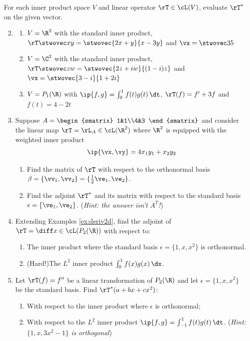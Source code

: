 \begin{exercises}
\exstart For each inner product space $V$ and linear operator $\rT\in\cL(V)$, evaluate $\rT^*$ on the given vector.
\begin{enumerate}\setcounter{enumi}{1}
  \item[]\begin{enumerate}
    \item $V=\R^2$ with the standard inner product, $\rT\stwovec xy=\stwovec{2x+y}{x-3y}$ and $\vx=\stwovec 35$
    \item $V=\C^2$ with the standard inner product, $\rT\stwovec zw=\stwovec{2z+iw}{(1-i)z}$ and $\vx=\stwovec{3-i}{1+2i}$
    \item $V=P_1(\R)$ with $\ip{f,g}=\int_0^1 f(t)g(t)\,\dt$, $\rT(f)=f'+3f$ and $f(t)=4-2t$
  \end{enumerate}
  
	\item Suppose $A=\begin{smatrix}
	1&1\\4&3
	\end{smatrix}$ and consider the linear map $\rT=\rL_A\in\cL(\R^2)$ where $\R^2$ is equipped with the weighted inner product
	\[\ip{\vx,\vy}=4x_1y_1+x_2y_2\]
	\begin{enumerate}
	  \item Find the matrix of $\rT$ with respect to the orthonormal basis $\beta=\{\vv_1,\vv_2\}=\{\frac 12\ve_1,\ve_2\}$.
	  \item	Find the adjoint $\rT^*$ and its matrix with respect to the standard basis $\epsilon=\{\ve_1,\ve_2\}$.\smallbreak
		(\emph{Hint: the answer isn't $A^T$!})
	\end{enumerate}
	
	\item Extending Examples \ref{ex:deriv2d}, find the adjoint of $\rT=\diff x\in\cL(P_2(\R))$ with respect to:
	\begin{enumerate}
	  \item The inner product where the standard basis $\epsilon=\{1,x,x^2\}$ is orthonormal.
	  \item (Hard!)\quad The $L^2$ inner product $\int_0^1f(x)g(x)\,\dx$.
	\end{enumerate}
  
  
  \item Let $\rT(f)=f''$ be a linear transformation of $P_2(\R)$ and let $\epsilon=\{1,x,x^2\}$ be the standard basis. Find $\rT^*(a+bx+cx^2)$:
  \begin{enumerate}
    \item With respect to the inner product where $\epsilon$ is orthonormal;
    \item With respect to the $L^2$ inner product $\ip{f,g}=\int_{-1}^1f(t)g(t)\,\dt$.\smallbreak
    (\emph{Hint: $\{1,x,3x^2-1\}$ is orthogonal})
  \end{enumerate}
  

\end{enumerate}
\end{exercises}
